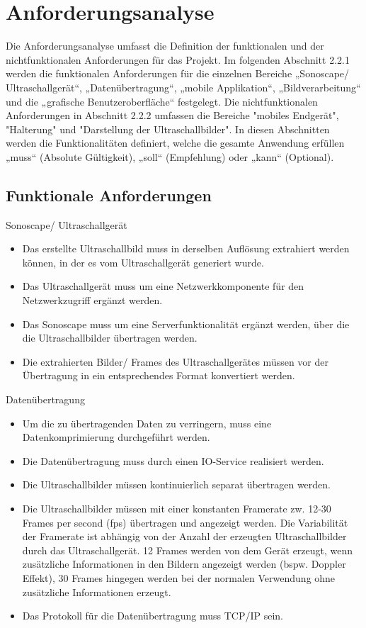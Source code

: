 \section{Anforderungsanalyse}
Die Anforderungsanalyse umfasst die Definition der funktionalen und der nichtfunktionalen Anforderungen für das Projekt. Im folgenden Abschnitt 2.2.1 werden die funktionalen Anforderungen für die einzelnen Bereiche „Sonoscape/ Ultraschallgerät“, „Datenübertragung“, „mobile Applikation“, „Bildverarbeitung“ und die „grafische Benutzeroberfläche“ festgelegt. Die nichtfunktionalen Anforderungen in Abschnitt 2.2.2 umfassen die Bereiche "mobiles Endgerät", "Halterung" und "Darstellung der Ultraschallbilder". In diesen Abschnitten werden die  Funktionalitäten definiert, welche die gesamte Anwendung erfüllen „muss“ (Absolute Gültigkeit), „soll“ (Empfehlung) oder „kann“ (Optional).   
\subsection{Funktionale Anforderungen}
\begin{minipage}{\textwidth}
Sonoscape/ Ultraschallgerät
\begin{itemize}
\item Das erstellte Ultraschallbild muss in derselben Auflösung extrahiert werden können, in der es vom Ultraschallgerät generiert wurde.
\item Das Ultraschallgerät muss um eine Netzwerkkomponente für den Netzwerkzugriff ergänzt werden.
\item Das Sonoscape muss um eine Serverfunktionalität ergänzt werden, über die die Ultraschallbilder übertragen werden.
\item Die extrahierten Bilder/ Frames des Ultraschallgerätes müssen vor der Übertragung in ein entsprechendes Format konvertiert werden.
\end{itemize}
\end{minipage}

\begin{minipage}{\textwidth}
Datenübertragung
\begin{itemize}
\item Um die zu übertragenden Daten zu verringern, muss eine Datenkomprimierung durchgeführt werden. 
\item Die Datenübertragung muss durch einen IO-Service realisiert werden.
\item Die Ultraschallbilder müssen kontinuierlich separat übertragen werden.
\item Die Ultraschallbilder müssen mit einer konstanten Framerate zw. 12-30 Frames per second (fps) übertragen und angezeigt werden. Die Variabilität der Framerate ist abhängig von der Anzahl der erzeugten Ultraschallbilder durch das Ultraschallgerät. 12 Frames werden von dem Gerät erzeugt, wenn zusätzliche Informationen in den Bildern angezeigt werden (bspw. Doppler Effekt), 30 Frames hingegen werden bei der normalen Verwendung ohne zusätzliche Informationen erzeugt.
\item Das Protokoll für die Datenübertragung muss TCP/IP sein.
\end{itemize}
\end{minipage}

